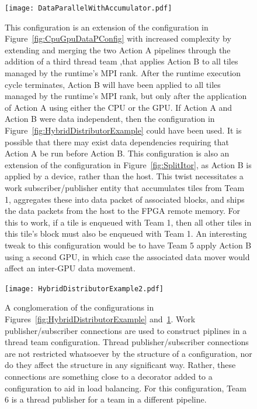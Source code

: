 \documentclass{article}
\begin{document}
\begin{appendices}
\begin{figure}[!hp]
\begin{center}
\texttt{[image: DataParallelWithAccumulator.pdf]}
\caption[]{This configuration is an extension of the configuration in
Figure~\ref{fig:CpuGpuDataPConfig} with increased complexity by extending
and merging the two Action A pipelines through the addition of a third thread
team ,that applies Action B to all tiles managed by the runtime's MPI rank.
After the runtime execution cycle
terminates, Action B will have been applied to all tiles managed by the
runtime's MPI rank, but only after the application of Action A using either the CPU
or the GPU.  If Action A and Action B were data independent, then the
configuration in Figure~\ref{fig:HybridDistributorExample}
could have been used.  It is possible that there may exist data
dependencies requiring that
Action A be run before Action B.  This configuration is
also an extension of the configuration in Figure~\ref{fig:SplitItor}, as Action B
is applied by a device, rather than the host.  This twist necessitates a work
subscriber/publisher entity that accumulates tiles from Team 1, aggregates these
into data packet of associated blocks, and ships the data packets from the
host to the FPGA remote memory.  For this to work, if a tile is enqueued with
Team 1, then all other tiles in this tile's block must also be enqueued with
Team 1.  An interesting tweak to this configuration would be to have Team 5
apply Action B using a second GPU, in which case the associated data mover would
affect an inter-GPU data movement.}
\label{fig:DataPWithAcc}
\end{center}
\end{figure}

\begin{figure}[!hp]
\begin{center}
\texttt{[image: HybridDistributorExample2.pdf]}
\caption[]{A conglomeration of the configurations in
Figures~\ref{fig:HybridDistributorExample} and~\ref{fig:DataPWithAcc}. Work
publisher/subscriber connections are used to construct piplines in a
thread team configuration.  Thread publisher/subscriber connections are
not restricted whatsoever by the structure of a configuration, nor do they affect
the structure in any significant way.  Rather, these connections are something
close to a decorator added to a configuration to aid in load
balancing.  For this configuration, Team 6 is a thread publisher for a
team in a different pipeline.}
\label{fig:HybridDistConfig2}
\end{center}
\end{figure}


\end{appendices}
\end{document}
